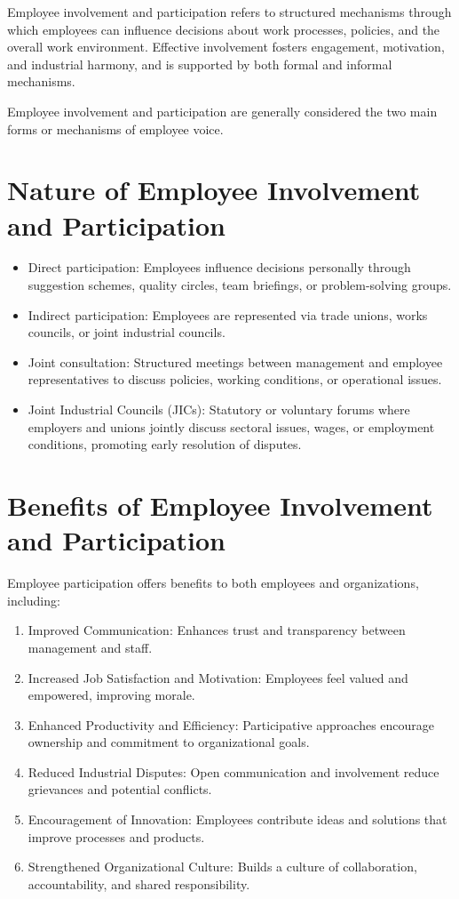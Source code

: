 \documentclass[10pt]{article}
\begin{document}
Employee involvement and participation refers to structured mechanisms through which employees can influence decisions about work processes, policies, and the overall work environment. Effective involvement fosters engagement, motivation, and industrial harmony, and is supported by both formal and informal mechanisms.

Employee involvement and participation are generally considered the two main forms or mechanisms of employee voice.

\section*{Nature of Employee Involvement and Participation}
\begin{itemize}
  \item Direct participation: Employees influence decisions personally through suggestion schemes, quality circles, team briefings, or problem-solving groups.
  \item Indirect participation: Employees are represented via trade unions, works councils, or joint industrial councils.
  \item Joint consultation: Structured meetings between management and employee representatives to discuss policies, working conditions, or operational issues.
  \item Joint Industrial Councils (JICs): Statutory or voluntary forums where employers and unions jointly discuss sectoral issues, wages, or employment conditions, promoting early resolution of disputes.
\end{itemize}

\section*{Benefits of Employee Involvement and Participation}
Employee participation offers benefits to both employees and organizations, including:

\begin{enumerate}
  \item Improved Communication: Enhances trust and transparency between management and staff.
  \item Increased Job Satisfaction and Motivation: Employees feel valued and empowered, improving morale.
  \item Enhanced Productivity and Efficiency: Participative approaches encourage ownership and commitment to organizational goals.
  \item Reduced Industrial Disputes: Open communication and involvement reduce grievances and potential conflicts.
  \item Encouragement of Innovation: Employees contribute ideas and solutions that improve processes and products.
  \item Strengthened Organizational Culture: Builds a culture of collaboration, accountability, and shared responsibility.
\end{enumerate}
\end{document}
